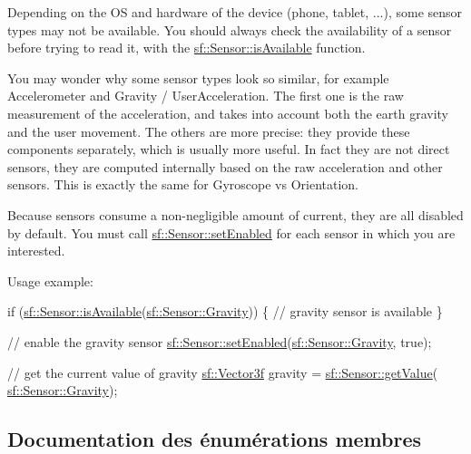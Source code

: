 Depending on the OS and hardware of the device (phone, tablet, ...), some sensor types may not be available. You should always check the availability of a sensor before trying to read it, with the \hyperlink{classsf_1_1Sensor_a7b7a2570218221781233bd495323abf0}{sf\+::\+Sensor\+::is\+Available} function.

You may wonder why some sensor types look so similar, for example Accelerometer and Gravity / User\+Acceleration. The first one is the raw measurement of the acceleration, and takes into account both the earth gravity and the user movement. The others are more precise\+: they provide these components separately, which is usually more useful. In fact they are not direct sensors, they are computed internally based on the raw acceleration and other sensors. This is exactly the same for Gyroscope vs Orientation.

Because sensors consume a non-\/negligible amount of current, they are all disabled by default. You must call \hyperlink{classsf_1_1Sensor_afb31c5697d2e0a5fec70d702ec1d6cd9}{sf\+::\+Sensor\+::set\+Enabled} for each sensor in which you are interested.

Usage example\+: 
\begin{DoxyCode}
\textcolor{keywordflow}{if} (\hyperlink{classsf_1_1Sensor_a7b7a2570218221781233bd495323abf0}{sf::Sensor::isAvailable}(\hyperlink{classsf_1_1Sensor_a687375af3ab77b818fca73735bcaea84afab4d098cc64e791a0c4a9ef6b32db92}{sf::Sensor::Gravity}))
\{
    \textcolor{comment}{// gravity sensor is available}
\}

\textcolor{comment}{// enable the gravity sensor}
\hyperlink{classsf_1_1Sensor_afb31c5697d2e0a5fec70d702ec1d6cd9}{sf::Sensor::setEnabled}(\hyperlink{classsf_1_1Sensor_a687375af3ab77b818fca73735bcaea84afab4d098cc64e791a0c4a9ef6b32db92}{sf::Sensor::Gravity}, \textcolor{keyword}{true});

\textcolor{comment}{// get the current value of gravity}
\hyperlink{classsf_1_1Vector3}{sf::Vector3f} gravity = \hyperlink{classsf_1_1Sensor_ab9a2710f55ead2f7b4e1b0bead34457e}{sf::Sensor::getValue}(
      \hyperlink{classsf_1_1Sensor_a687375af3ab77b818fca73735bcaea84afab4d098cc64e791a0c4a9ef6b32db92}{sf::Sensor::Gravity});
\end{DoxyCode}
 

\subsection{Documentation des énumérations membres}
\mbox{\label{classsf_1_1Sensor_a687375af3ab77b818fca73735bcaea84}} 
